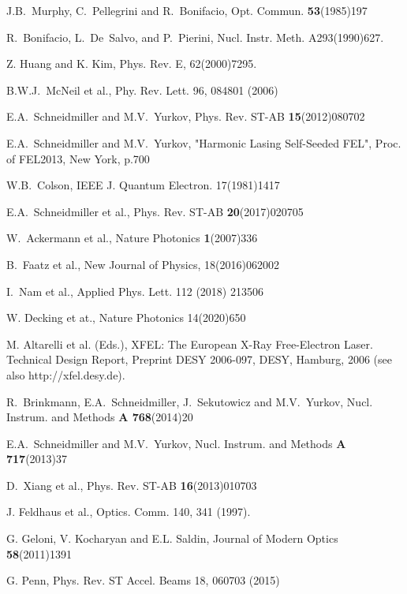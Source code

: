 \documentclass[aps,prl,preprint,groupedaddress,preprintnumbers]{revtex4}
\begin{document}
\begin{thebibliography}{99}   %

J.B.~Murphy, C.~Pellegrini and R.~Bonifacio,
Opt. Commun. {\bf 53}(1985)197

R.~Bonifacio, L.~De~Salvo, and P.~Pierini,
Nucl. Instr. Meth. A293(1990)627.

Z. Huang and K. Kim, Phys. Rev. E, 62(2000)7295.

B.W.J.~McNeil et al., Phy. Rev. Lett. 96, 084801 (2006)

E.A.~Schneidmiller and M.V.~Yurkov,
Phys. Rev. ST-AB {\bf 15}(2012)080702

E.A.~Schneidmiller and M.V.~Yurkov, "Harmonic Lasing Self-Seeded FEL", Proc. of FEL2013, New York, p.700

W.B.~Colson, IEEE J. Quantum Electron. 17(1981)1417


E.A.~Schneidmiller et al., Phys. Rev. ST-AB {\bf 20}(2017)020705

W.~Ackermann et al., Nature Photonics {\bf 1}(2007)336

B.~Faatz et al.,
New Journal of Physics, 18(2016)062002

 I.~Nam et al., Applied Phys. Lett. 112 (2018) 213506

W. Decking et at., Nature Photonics 14(2020)650

M. Altarelli et al. (Eds.),
XFEL: The European X-Ray Free-Electron Laser. Technical Design Report,
Preprint DESY 2006-097, DESY, Hamburg, 2006 (see also http://xfel.desy.de).

R.~Brinkmann, E.A.~Schneidmiller, J.~Sekutowicz and M.V.~Yurkov,
Nucl. Instrum. and Methods {\bf A 768}(2014)20

E.A.~Schneidmiller and M.V.~Yurkov,
Nucl. Instrum. and Methods {\bf A 717}(2013)37

D.~Xiang et al., Phys. Rev. ST-AB {\bf 16}(2013)010703

J. Feldhaus et al., Optics. Comm. 140, 341 (1997).

G. Geloni, V. Kocharyan and E.L. Saldin,  Journal of Modern Optics {\bf 58}(2011)1391

G. Penn, 
Phys. Rev. ST Accel. Beams 18, 060703 (2015) 


\end{thebibliography}
\end{document}
